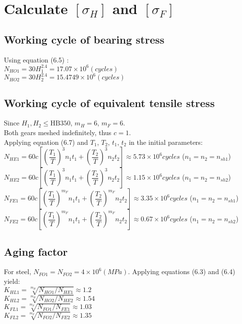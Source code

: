 \section{Calculate $ [\sigma_H] $ and $ [\sigma_F] $}
\subsection{Working cycle of bearing stress}
Using equation (6.5) :\\
$ N_{HO1} = 30H_1^{2.4} = 17.07\times10^6\unit{(cycles)}$\\
$ N_{HO2} = 30H_2^{2.4} = 15.4749\times10^6\unit{(cycles)}$
\subsection{Working cycle of equivalent tensile stress}
Since $ H_1,H_2\leq\text{HB}350 $, $ m_H=6 $, $ m_F=6 $.\\
Both gears meshed indefinitely, thus $ c=1 $.\\ Applying equation (6.7)  and $ T_1 $, $ T_2 $, $ t_1 $, $ t_2 $ in the initial parameters:\\
$ N_{HE1} = 60c\left[ \left( \dfrac{T_1}{T}\right)^3n_1t_1 + \left( \dfrac{T_2}{T}\right)^3n_2t_2\right] \approx 5.73\times10^6\unit{cycles}$ ($ n_1=n_2=n_{sh1} $)\\
$ N_{HE2} = 60c\left[ \left( \dfrac{T_1}{T}\right)^3n_1t_1 + \left( \dfrac{T_2}{T}\right)^3n_2t_2\right] \approx 1.15\times10^6\unit{cycles}$ ($ n_1=n_2=n_{sh2} $)\\
$ N_{FE1} = 60c\left[ \left( \dfrac{T_1}{T}\right)^{m_F}n_1t_1 + \left( \dfrac{T_2}{T}\right)^{m_F}n_2t_2\right] \approx 3.35\times10^6\unit{cycles}$ ($ n_1=n_2=n_{sh1} $)\\
$ N_{FE2} = 60c\left[ \left( \dfrac{T_1}{T}\right)^{m_F}n_1t_1 + \left( \dfrac{T_2}{T}\right)^{m_F}n_2t_2\right] \approx 0.67\times10^6\unit{cycles}$ ($ n_1=n_2=n_{sh2} $)\\
\subsection{Aging factor}
For steel, $ N_{FO1} = N_{FO2} = 4\times10^6\unit{(MPa)}$. Applying equations (6.3) and (6.4)  yield:\\
$K_{HL1} = \sqrt[m_H]{N_{HO1}/N_{HE1}} \approx 1.2$\\
$ K_{HL2} = \sqrt[m_H]{N_{HO2}/N_{HE2}} \approx 1.54$\\
$ K_{FL1} = \sqrt[m_F]{N_{FO1}/N_{FE1}} \approx 1.03$\\
$ K_{FL2} = \sqrt[m_F]{N_{FO2}/N_{FE2}} \approx 1.35$
